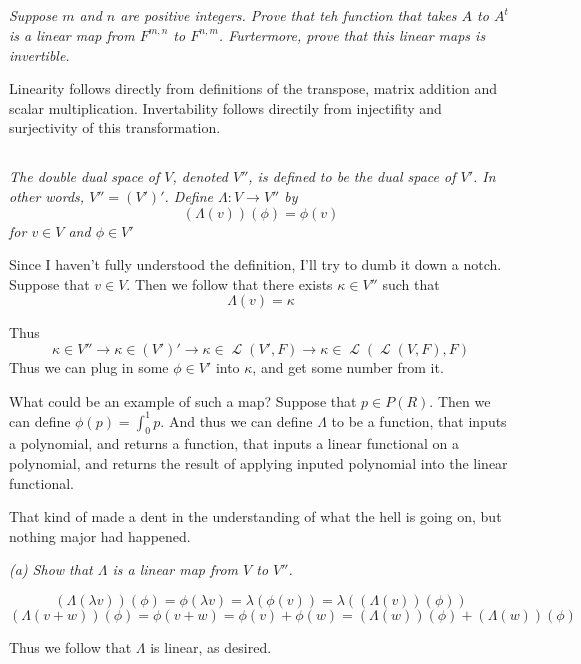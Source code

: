 \documentclass[11pt,oneside,titlepage]{book}
\DeclareMathOperator \map {\mathcal {L}}
\begin{document}
\subsection{}

\textit{Suppose $m$ and $n$ are positive integers. Prove that teh function that takes
  $A$ to $A^t$ is a linear map from $F^{m, n}$ to $F^{n, m}$. Furtermore, prove that this linear
  maps is invertible.}


Linearity follows directly from definitions of the transpose, matrix addition and scalar
multiplication. Invertability follows directily from injectifity and surjectivity of this
transformation.

\subsection{}

\textit{The double dual space of $V$, denoted $V''$, is defined to be the dual space of $V'$. In
  other words, $V'' = (V')'$. Define $\Lambda: V \to V''$ by}
$$(\Lambda(v))(\phi) = \phi(v)$$
\textit{for $v \in V$ and $\phi \in V'$}

Since I haven't fully understood the definition, I'll try to dumb it down a notch. Suppose that
$v \in V$. Then we follow that there exists $\kappa \in V''$ such that
$$\Lambda(v) = \kappa$$

Thus
$$\kappa \in V'' \to \kappa \in (V')' \to \kappa \in \map(V', F)
\to \kappa \in \map(\map(V, F), F)$$
Thus we can plug in some $\phi \in V'$ into $\kappa$, and get some number from it.

What could be an example of such a map? Suppose that
$p \in P(R)$. Then we can define $\phi(p) = \int_0^1{p}$. And thus we can define
$\Lambda$ to be a function, that inputs a polynomial, and returns a function, that
inputs a linear functional on a polynomial, and returns the result of applying inputed
polynomial into the linear functional.

That kind of made a dent in the understanding of what the hell is going on, but nothing major
had happened.

\textit{(a) Show that $\Lambda$ is a linear map from $V$ to $V''$.}

$$(\Lambda (\lambda v))(\phi) = \phi(\lambda v) = \lambda (\phi (v)) =
\lambda ((\Lambda(v))(\phi))$$
$$(\Lambda (v + w))(\phi) = \phi(v + w) = \phi(v) + \phi(w) = (\Lambda(w))(\phi) +
(\Lambda(w))(\phi)$$

Thus we follow that $\Lambda$ is linear, as desired.
\end{document}
